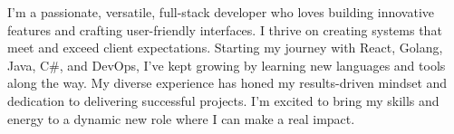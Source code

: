 I'm a passionate, versatile, full-stack developer who loves building innovative features and crafting user-friendly interfaces. I thrive on creating systems that meet and exceed client expectations. Starting my journey with React, Golang, Java, C\#, and DevOps, I've kept growing by learning new languages and tools along the way. My diverse experience has honed my results-driven mindset and dedication to delivering successful projects. I'm excited to bring my skills and energy to a dynamic new role where I can make a real impact.